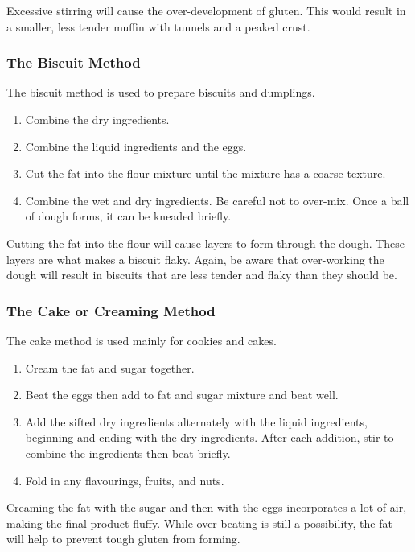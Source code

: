 Excessive stirring will cause the over-development of gluten. This would result in a smaller, less tender muffin with tunnels and a peaked crust. 

\subsubsection{The Biscuit Method}\label{method:Biscuit}
The biscuit method is used to prepare biscuits and dumplings.

\begin{enumerate}
\item Combine the dry ingredients.
\item Combine the liquid ingredients and the eggs.
\item Cut the fat into the flour mixture until the mixture has a coarse texture.
\item Combine the wet and dry ingredients. Be careful not to over-mix. Once a ball of dough forms, it can be kneaded briefly.
\end{enumerate}

Cutting the fat into the flour will cause layers to form through the dough. These layers are what makes a biscuit flaky. Again, be aware that over-working the dough will result in biscuits that are less tender and flaky than they should be.
 
\subsubsection{The Cake or Creaming Method}\label{method:Creaming}
The cake method is used mainly for cookies and cakes.

\begin{enumerate}
\item Cream the fat and sugar together.
\item Beat the eggs then add to fat and sugar mixture and beat well.
\item Add the sifted dry ingredients alternately with the liquid ingredients, beginning and ending with the dry ingredients. After each addition, stir to combine the ingredients then beat briefly.
\item Fold in any flavourings, fruits, and nuts.
\end{enumerate}

Creaming the fat with the sugar and then with the eggs incorporates a lot of air, making the final product fluffy. While over-beating is still a possibility, the fat will help to prevent tough gluten from forming.

